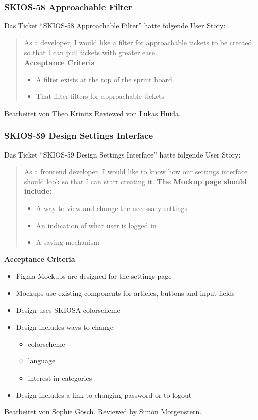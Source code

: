 \subsubsection{SKIOS-58 Approachable Filter}
Das Ticket \enquote{SKIOS-58 Approachable Filter} hatte folgende User Story:
\begin{quotation}
    As a developer, I would like a filter for approachable tickets to be created, so that I can pull tickets with greater ease.\\
    \textbf{Acceptance Criteria}
    \begin{itemize}
        \item A filter exists at the top of the sprint board
        \item That filter filters for approachable tickets
    \end{itemize}
\end{quotation}
Bearbeitet von Theo Krinitz
Reviewed von Lukas Huida.


\subsubsection{SKIOS-59 Design Settings Interface}
Das Ticket \enquote{SKIOS-59 Design Settings Interface} hatte folgende User Story:
\begin{quotation}
    As a frontend developer, I would like to know how our settings interface should look so that I can start creating it.
    \textbf{The Mockup page should include:}
        \begin{itemize}
            \item A way to view and change the necessary settings
            \item An indication of what user is logged in
            \item A saving mechanism
        \end{itemize}
\end{quotation}
\textbf{Acceptance Criteria}
    \begin{itemize}
        \item Figma Mockups are designed for the settings page
        \item Mockups use existing components for articles, buttons and input fields
        \item Design uses SKIOSA colorscheme
        \item Design includes ways to change
        \begin{itemize}
            \item colorscheme
            \item language
            \item interest in categories
        \end{itemize}
        \item Design includes a link to changing password or to logout 
    \end{itemize}
Bearbeitet von Sophie Gösch.
Reviewed by Simon Morgenstern.

